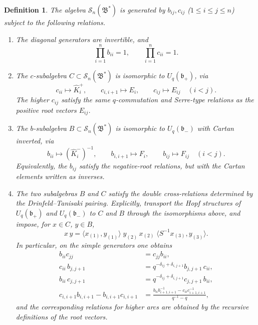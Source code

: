 \documentclass[11pt]{article}
\newcommand{\bcS}{\mathcal S}
\newcommand{\fB}{\mathfrak B}
\newcommand{\fb}{\mathfrak b}
\newcommand{\la}{\langle}
\newcommand{\ra}{\rangle}
\newcommand{\Khat}{\widehat K}
\newtheorem{definition}[theorem]{Definition}
\begin{document}
\begin{definition}\label{def:S-presentation}
The algebra \(\bcS_n(\fB^*)\) is generated by \(b_{ij},c_{ij}\) (\(1\le i\le j\le n\)) subject to the following relations.
\begin{enumerate}[label=(S\arabic*)]
\item The diagonal generators are invertible, and
\[
\prod_{i=1}^n b_{ii}=1,\qquad \prod_{i=1}^n c_{ii}=1.
\]
\item The \(c\)-subalgebra \(C\subset\bcS_n(\fB^*)\) is isomorphic to \(U_q(\fb_+)\), via
\[
c_{ii}\longmapsto \Khat_i^+,\qquad
c_{i,i+1}\longmapsto E_i,\qquad
c_{ij}\longmapsto E_{ij}\quad(i<j).
\]
The higher \(c_{ij}\) satisfy the same \(q\)-commutation and Serre-type relations as the positive root vectors \(E_{ij}\).
\item The \(b\)-subalgebra \(B\subset\bcS_n(\fB^*)\) is isomorphic to \(U_q(\fb_-)\) with Cartan inverted, via
\[
b_{ii}\longmapsto (\Khat_i^-)^{-1},\qquad
b_{i,i+1}\longmapsto F_i,\qquad
b_{ij}\longmapsto F_{ij}\quad(i<j).
\]
Equivalently, the \(b_{ij}\) satisfy the negative-root relations, but with the Cartan elements written as inverses.
\item The two subalgebras \(B\) and \(C\) satisfy the double cross-relations determined by the Drinfeld--Tanisaki pairing.  Explicitly, transport the Hopf structures of \(U_q(\fb_+)\) and \(U_q(\fb_-)\) to \(C\) and \(B\) through the isomorphisms above, and impose, for \(x\in C\), \(y\in B\),
\begin{equation}\label{eq:S-cross}
x\,y
=
\la x_{(1)},y_{(1)}\ra\;
y_{(2)}\,x_{(2)}\;
\la S^{-1}x_{(3)},y_{(3)}\ra.
\end{equation}
In particular, on the simple generators one obtains
\begin{align}
b_{ii}c_{jj}&=c_{jj}b_{ii},\label{eq:diag-commute}\\
c_{ii}\,b_{j,j+1}
&=
q^{-\delta_{ij}+\delta_{i,j+1}}
b_{j,j+1}\,c_{ii},\label{eq:cF}\\
b_{ii}\,c_{j,j+1}
&=
q^{-\delta_{ij}+\delta_{i,j+1}}
c_{j,j+1}\,b_{ii},\label{eq:bE}\\
c_{i,i+1}b_{i,i+1}-b_{i,i+1}c_{i,i+1}
&=
\frac{
b_{ii}b_{i+1,i+1}^{-1}-c_{ii}c_{i+1,i+1}^{-1}
}{
q^{-1}-q
},\label{eq:simple-cross}
\end{align}
and the corresponding relations for higher arcs are obtained by the recursive definitions of the root vectors.
\end{enumerate}
\end{definition}
\end{document}
